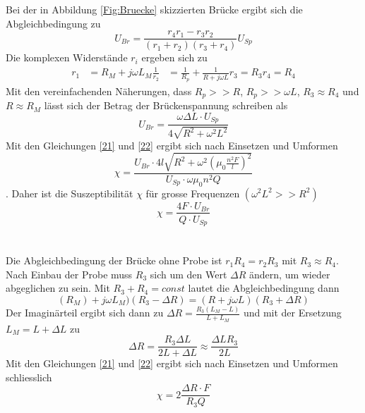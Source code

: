 Bei der in Abbildung \ref{Fig:Bruecke} skizzierten Brücke ergibt sich die Abgleichbedingung zu 
\begin{equation*}
    U_{Br}=\frac{r_4r_1-r_3r_2}{(r_1+r_2)(r_3+r_4)}U_{Sp}
\end{equation*}
Die komplexen Widerstände $r_i$ ergeben sich zu 
\begin{align*}
    r_1&=R_M+j\omega L_M
    \frac{1}{r_2}&=\frac{1}{R_p}+\frac{1}{R+j\omega L}
    r_3=R_3
    r_4=R_4
\end{align*}
Mit den vereinfachenden Näherungen, dass $R_p>>R$, $R_p>>\omega L$, $R_3\approx R_4$ und $R\approx R_M$ lässt sich der Betrag der Brückenspannung schreiben als 
\begin{equation*}
    U_{Br}=\frac{\omega \Delta L\cdot U_{Sp}}{4\sqrt{R^2+\omega^2L^2}}
\end{equation*}
Mit den Gleichungen \ref{21} und \ref{22} ergibt sich nach Einsetzen und Umformen
\begin{equation*}
    \chi=\frac{U_{Br}\cdot 4l\sqrt{R^2+\omega^2(\mu_0\frac{n^2F}{l})^2}}{U_{Sp}\cdot\omega\mu_0n^2Q}
\end{equation*}.
Daher ist die Suszeptibilität $\chi$ für grosse Frequenzen $(\omega^2L^2>>R^2)$
\begin{equation}\label{XU}
    \chi=\frac{4F\cdot U_{Br}}{Q\cdot U_{Sp}}
\end{equation}\\\\
Die Abgleichbedingung der Brücke ohne Probe ist $r_1R_4=r_2R_3$ mit $R_3\approx R_4$. Nach Einbau der Probe muss $R_3$ sich um den Wert $\Delta R$ ändern, um wieder abgeglichen zu sein. Mit $R_3+R_4=const$ lautet die Abgleichbedingung dann 
\begin{equation*}
    (R_M)+j\omega L_M)(R_3-\Delta R)=(R+j\omega L)(R_3+\Delta R)
\end{equation*}
Der Imaginärteil ergibt sich dann zu $\Delta R=\frac{R_3(L_M-L)}{L+L_M}$ und mit der Ersetzung $L_M=L+\Delta L$ zu 
\begin{equation*}
    \Delta R=\frac{R_3\Delta L}{2L+\Delta L}\approx\frac{\Delta LR_3}{2L}
\end{equation*}
Mit den Gleichungen \ref{21} und \ref{22} ergibt sich nach Einsetzen und Umformen schliesslich
\begin{equation}\label{XR}
    \chi=2\frac{\Delta R\cdot F}{R_3Q}
\end{equation}
